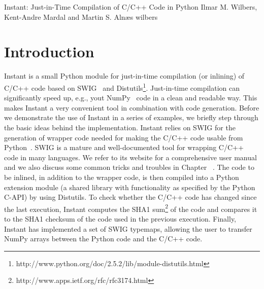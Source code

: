 

              {Instant: Just-in-Time Compilation of C/C++ Code in Python}
              {Ilmar M. Wilbers, Kent-Andre Mardal and Martin S. Aln{\ae}s}
              {wilbers}

%



\section{Introduction}

Instant is a small Python module for just-in-time compilation (or inlining) of
C/C++ code based on SWIG~\cite{SWIG} and
Distutils\footnote{http://www.python.org/doc/2.5.2/lib/module-distutils.html}. 
Just-in-time compilation can significantly speed up, e.g., yout NumPy~\cite{NumPy} code in a clean and
readable way. This makes Instant a very convenient tool in combination with code
generation. Before we demonstrate the use of Instant in a series of examples,
we briefly step through the basic ideas behind the implementation.
Instant relies on SWIG for the generation of wrapper code needed for making the
C/C++ code usable from Python~\cite{Python}. SWIG is a mature and well-documented tool
for wrapping C/C++ code in many languages. We refer to its website for a comprehensive 
user manual and we also discuss some common tricks and troubles in Chapter ~\cite{mixedlanguage}. 
The code to be inlined, in addition to the
wrapper code, is then compiled into a Python extension module (a shared library
with functionality as specified by the Python C-API) by using
Distutils. To check whether the C/C++ code has changed since the last
execution, Instant computes the SHA1
sum\footnote{http://www.apps.ietf.org/rfc/rfc3174.html} of the code and compares it to
the SHA1 checksum of the code used in the previous execution. Finally, Instant has
implemented a set of SWIG typemaps, allowing the user to
transfer NumPy arrays between the Python code and the C/C++ code.

